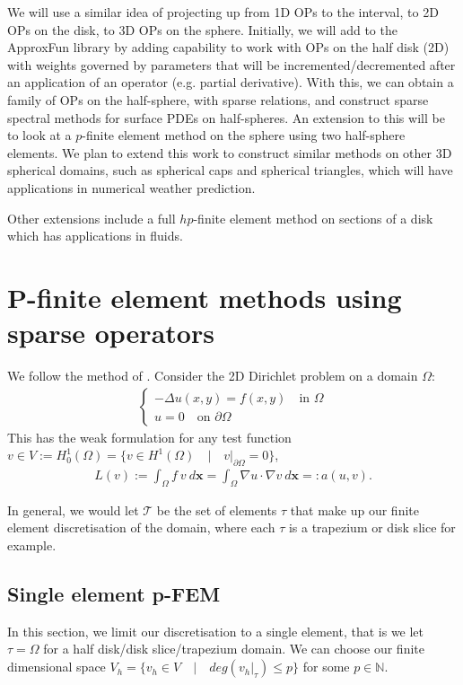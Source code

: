 \documentclass[11pt, oneside]{article}   	%
\newcommand{\N}{\mathbb{N}}
\newcommand{\element}{\tau}
\newcommand{\FEset}{\mathcal{T}}
\begin{document}
We will use a similar idea of projecting up from 1D OPs to the interval, to 2D OPs on the disk, to 3D OPs on the sphere. Initially, we will add to the ApproxFun library by adding capability to work with OPs on the half disk (2D) with weights governed by parameters that will be incremented/decremented after an application of an operator (e.g. partial derivative). With this, we can obtain a family of OPs on the half-sphere, with sparse relations, and construct sparse spectral methods for surface PDEs on half-spheres. An extension to this will be to look at a $p$-finite element method on the sphere using two half-sphere elements. We plan to extend this work to construct similar methods on other 3D spherical domains, such as spherical caps and spherical triangles, which will have applications in numerical weather prediction. 

Other extensions include a full $hp$-finite element method on sections of a disk which has applications in fluids. 

%
\appendix
%
\section{P-finite element methods using sparse operators}

We follow the method of \cite{beuchler2006new}. Consider the 2D Dirichlet problem on a domain $\Omega$:
\begin{align}
	\begin{cases}
         - \Delta u(x,y) = f(x,y) \quad \text{in } \Omega \\
         u = 0 \quad \text{on } \partial \Omega
         \end{cases}
\end{align}
This has the weak formulation for any test function $v \in V := H_0^1(\Omega) = \{v \in H^1(\Omega) \quad | \quad v|_{\partial \Omega} = 0 \}$,
\begin{align}
	L(v) := \int_\Omega f \: v \: d\mathbf{x} = \int_\Omega \nabla u \cdot \nabla v \: d\mathbf{x} =: a(u,v).
\end{align}

In general, we would let $\FEset$ be the set of elements $\element$ that make up our finite element discretisation of the domain, where each $\element$ is a trapezium or disk slice for example. 

\subsection{Single element p-FEM}
In this section, we limit our discretisation to a single element, that is we let $\element = \Omega$ for a half disk/disk slice/trapezium domain. We can choose our finite dimensional space $V_h = \{v_h \in V \quad | \quad deg(v_h|_\element) \le p\}$ for some $p \in \N$.
\end{document}
